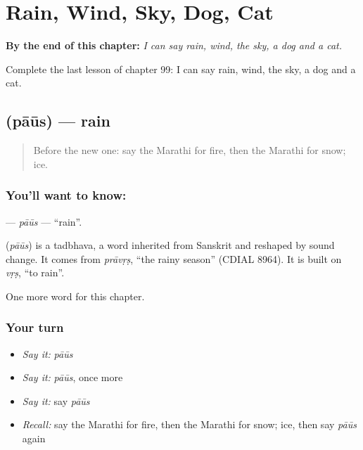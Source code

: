 
\chapter{Rain, Wind, Sky, Dog, Cat}
\label{ch:mr-rain-wind-sky-dog-cat}

\begin{chapteropening}
\textbf{By the end of this chapter:} \emph{I can say rain, wind, the sky, a dog and a cat.}

Complete the last lesson of chapter 99: I can say rain, wind, the sky, a dog and a cat.
\end{chapteropening}

\section[\texorpdfstring{\mr{पाऊस} (pāūs)}{पाऊस (pāūs)}]{ (pāūs) — rain}

\label{lesson:MR-C99-paus}



\begin{quote}
Before the new one: say the Marathi for fire, then the Marathi for snow; ice.
\end{quote}

\subsection*{You'll want to know: }
\textbf{} — \emph{pāūs} — \textquotedblleft{}rain\textquotedblright{}.

\begin{cousinweb}
\textbf{} (\emph{pāūs}) is a tadbhava, a word inherited from Sanskrit and reshaped by sound change. It comes from \emph{prāvṛṣ}, \textquotedblleft{}the rainy season\textquotedblright{} (CDIAL 8964). It is built on \emph{vṛṣ}, \textquotedblleft{}to rain\textquotedblright{}.
\end{cousinweb}

\begin{grammarlens}[title={What you've built}]
One more word for this chapter.
\end{grammarlens}

\subsection*{Your turn}
\begin{itemize}
\raggedright
  \item \emph{Say it:} \emph{pāūs}
  \item \emph{Say it:} \emph{pāūs}, once more
  \item \emph{Say it:} say \emph{pāūs}
  \item \emph{Recall:} say the Marathi for fire, then the Marathi for snow; ice, then say \emph{pāūs} again
\end{itemize}

